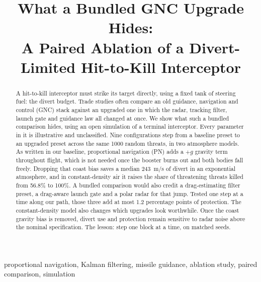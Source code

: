 \documentclass[conference,letterpaper]{IEEEtran}
\begin{document}
\title{What a Bundled GNC Upgrade Hides:\\A Paired Ablation of a Divert-Limited Hit-to-Kill Interceptor}

\author{
}

\maketitle

\begin{abstract}
A hit-to-kill interceptor must strike its target directly, using a fixed tank of steering fuel: the divert budget.
Trade studies often compare an old guidance, navigation and control (GNC) stack against an upgraded one in which the radar, tracking filter, launch gate and guidance law all changed at once.
We show what such a bundled comparison hides, using an open simulation of a terminal interceptor.
Every parameter in it is illustrative and unclassified.
Nine configurations step from a baseline preset to an upgraded preset across the same 1000 random threats, in two atmosphere models.
As written in our baseline, proportional navigation (PN) adds a $+g$ gravity term throughout flight, which is not needed once the booster burns out and both bodies fall freely.
Dropping that coast bias saves a median 243~m/s of divert in an exponential atmosphere, and in constant-density air it raises the share of threatening threats killed from 56.8\% to 100\%.
A bundled comparison would also credit a drag-estimating filter preset, a drag-aware launch gate and a polar radar for that jump.
Tested one step at a time along our path, those three add at most 1.2 percentage points of protection.
The constant-density model also changes which upgrades look worthwhile.
Once the coast gravity bias is removed, divert use and protection remain sensitive to radar noise above the nominal specification.
The lesson: step one block at a time, on matched seeds.
\end{abstract}

\begin{IEEEkeywords}
proportional navigation, Kalman filtering, missile guidance, ablation study, paired comparison, simulation
\end{IEEEkeywords}

\end{document}
